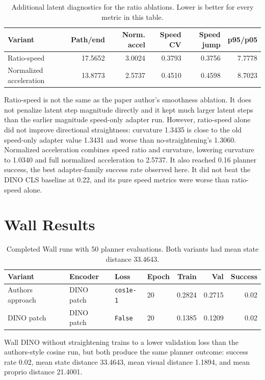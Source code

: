 \documentclass[11pt]{article}
\begin{document}
\begin{table}[h]
\centering
\small
\begin{tabular}{lrrrrr}
\toprule
Variant & Path/end & Norm. accel & Speed CV & Speed jump & p95/p05 \\
\midrule
Ratio-speed & 17.5652 & 3.0024 & 0.3793 & 0.3756 & 7.7778 \\
Normalized acceleration & 13.8773 & 2.5737 & 0.4510 & 0.4598 & 8.7023 \\
\bottomrule
\end{tabular}
\caption{Additional latent diagnostics for the ratio ablations. Lower is better for every metric in this table.}
\end{table}

Ratio-speed is not the same as the paper author's smoothness ablation. It does not penalize latent step magnitude directly and it kept much larger latent steps than the earlier magnitude speed-only adapter run. However, ratio-speed alone did not improve directional straightness: curvature 1.3435 is close to the old speed-only adapter value 1.3431 and worse than no-straightening's 1.3060. Normalized acceleration combines speed ratio and curvature, lowering curvature to 1.0340 and full normalized acceleration to 2.5737. It also reached 0.16 planner success, the best adapter-family success rate observed here. It did not beat the DINO CLS baseline at 0.22, and its pure speed metrics were worse than ratio-speed alone.

\section{Wall Results}

\begin{table}[h]
\centering
\begin{tabular}{llllrrr}
\toprule
Variant & Encoder & Loss & Epoch & Train & Val & Success \\
\midrule
Authors approach & DINO patch & \texttt{cos1e-1} & 20 & 0.2824 & 0.2715 & 0.02 \\
DINO patch & DINO patch & \texttt{False} & 20 & 0.1385 & 0.1209 & 0.02 \\
\bottomrule
\end{tabular}
\caption{Completed Wall runs with 50 planner evaluations. Both variants had mean state distance 33.4643.}
\end{table}

Wall DINO without straightening trains to a lower validation loss than the authors-style cosine run, but both produce the same planner outcome: success rate 0.02, mean state distance 33.4643, mean visual distance 1.1894, and mean proprio distance 21.4001.
\end{document}
